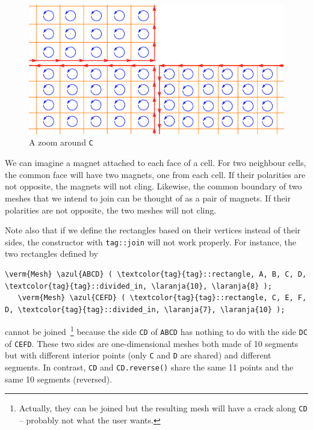 \begin{figure}[ht]  \centering
  \includegraphics[width=120mm]{L-crack}
  \caption{A zoom around {\small\tt C}}
  \label{\numb section 1.\numb fig 6}
\end{figure}

We can imagine a magnet attached to each face of a cell.
For two neighbour cells, the common face will have two magnets, one from each cell.
If their polarities are not opposite, the magnets will not cling.
Likewise, the common boundary of two meshes that we intend to join can be thought of
as a pair of magnets.
If their polarities are not opposite, the two meshes will not cling.

Note also that if we define the rectangles based on their vertices instead of their sides, 
the {\small\tt{}} constructor with {\small\tt \textcolor{tag}{tag}::join} will
not work properly. 
For instance, the two rectangles defined by

\begin{Verbatim}[commandchars=\\\{\},formatcom=\small\tt,baselinestretch=0.94]
   \verm{Mesh} \azul{ABCD} ( \textcolor{tag}{tag}::rectangle, A, B, C, D, \textcolor{tag}{tag}::divided_in, \laranja{10}, \laranja{8} );
   \verm{Mesh} \azul{CEFD} ( \textcolor{tag}{tag}::rectangle, C, E, F, D, \textcolor{tag}{tag}::divided_in, \laranja{7}, \laranja{10} );
\end{Verbatim}

\noindent cannot be joined$\,$%
\footnote {{} Actually, they can be joined but the resulting mesh will have
a crack along {\small\tt CD} -- probably not what the user wants.}
because the side {\small\tt CD} of {\small\tt ABCD} has nothing to do with the side 
{\small\tt DC} of {\small\tt CEFD}.
These two sides are one-dimensional meshes both made of 10 segments but with different
interior points (only {\small\tt C} and {\small\tt D} are shared) and different segments.
In contrast, {\small\tt CD} and {\small\tt CD.reverse()} share the same 11 points and
the same 10 segments (reversed).

